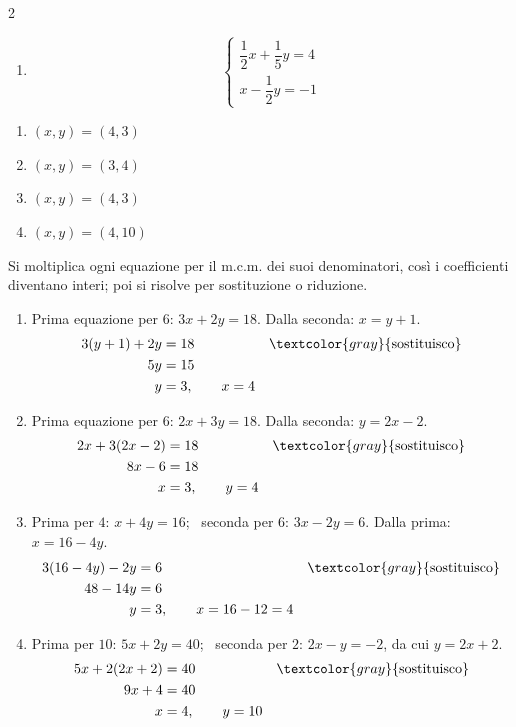 \begin{question}[ID=2.1, subtitle={Sistemi con coefficienti frazionari}, difficulty=facile, tags={sistemi, equazioni lineari, frazioni}]
\begin{multicols}{2}
\begin{enumerate}[leftmargin=3.2cm]
    \item
    \[
    \begin{cases}
    \dfrac{1}{2}x+\dfrac{1}{5}y=4\\
    x-\dfrac{1}{2}y=-1
    \end{cases}
    \]
\end{enumerate}
\end{multicols}
\begin{solution}
\begin{enumerate}
    \item $(x,y)=(4,3)$
    \item $(x,y)=(3,4)$
    \item $(x,y)=(4,3)$
    \item $(x,y)=(4,10)$
\end{enumerate}
\end{solution}
\begin{explanation}
Si moltiplica ogni equazione per il m.c.m. dei suoi denominatori, così i coefficienti diventano interi; poi si risolve per sostituzione o riduzione.
\begin{enumerate}
    \item Prima equazione per $6$: $3x+2y=18$. Dalla seconda: $x=y+1$.
    \[\begin{aligned}
    3(y+1)+2y &= 18 && \textcolor{gray}{\text{sostituisco}}\\
    5y &= 15\\
    y &= 3, \qquad x=4
    \end{aligned}\]
    \item Prima equazione per $6$: $2x+3y=18$. Dalla seconda: $y=2x-2$.
    \[\begin{aligned}
    2x+3(2x-2) &= 18 && \textcolor{gray}{\text{sostituisco}}\\
    8x-6 &= 18\\
    x &= 3, \qquad y=4
    \end{aligned}\]
    \item Prima per $4$: $x+4y=16$; \ seconda per $6$: $3x-2y=6$. Dalla prima: $x=16-4y$.
    \[\begin{aligned}
    3(16-4y)-2y &= 6 && \textcolor{gray}{\text{sostituisco}}\\
    48-14y &= 6\\
    y &= 3, \qquad x=16-12=4
    \end{aligned}\]
    \item Prima per $10$: $5x+2y=40$; \ seconda per $2$: $2x-y=-2$, da cui $y=2x+2$.
    \[\begin{aligned}
    5x+2(2x+2) &= 40 && \textcolor{gray}{\text{sostituisco}}\\
    9x+4 &= 40\\
    x &= 4, \qquad y=10
    \end{aligned}\]
\end{enumerate}
\end{explanation}
\end{question}

